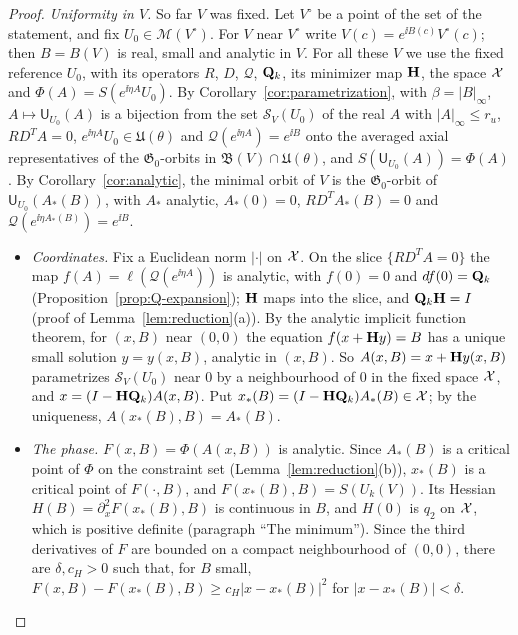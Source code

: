 \begin{proof}
\emph{Uniformity in $V$.} So far $V$ was fixed. Let $V^\circ$ be a point of the set of the statement, and fix $U_0\in\mathscr M(V^\circ)$. For $V$ near $V^\circ$ write $V(c)=e^{\ii B(c)}V^\circ(c)$; then $B=B(V)$ is real, small and analytic in $V$. For all these $V$ we use the fixed reference $U_0$, with its operators $R$, $D$, $\mathcal Q$, $\mathbf Q_k$, its minimizer map $\mathbf H$, the space $\mathcal X$ and $\Phi(A)=S(e^{\ii\eta A}U_0)$. By Corollary~\ref{cor:parametrization}, with $\beta=|B|_\infty$, $A\mapsto\mathsf U_{U_0}(A)$ is a bijection from the set $\mathcal S_V(U_0)$ of the real $A$ with $|A|_\infty\le r_u$, $RD^TA=0$, $e^{\ii\eta A}U_0\in\mathfrak U(\theta)$ and $\mathcal Q(e^{\ii\eta A})=e^{\ii B}$ onto the averaged axial representatives of the $\mathfrak G_0$-orbits in $\mathfrak B(V)\cap\mathfrak U(\theta)$, and $S(\mathsf U_{U_0}(A))=\Phi(A)$. By Corollary~\ref{cor:analytic}, the minimal orbit of $V$ is the $\mathfrak G_0$-orbit of $\mathsf U_{U_0}(A_*(B))$, with $A_*$ analytic, $A_*(0)=0$, $RD^TA_*(B)=0$ and $\mathcal Q(e^{\ii\eta A_*(B)})=e^{\ii B}$.
\begin{itemize}
\item[(i)] \emph{Coordinates.} Fix a Euclidean norm $|\cdot|$ on $\mathcal X$. On the slice $\{RD^TA=0\}$ the map $f(A)=\ell(\mathcal Q(e^{\ii\eta A}))$ is analytic, with $f(0)=0$ and $df(0)=\mathbf Q_k$ (Proposition~\ref{prop:Q-expansion}); $\mathbf H$ maps into the slice, and $\mathbf Q_k\mathbf H=I$ (proof of Lemma~\ref{lem:reduction}(a)). By the analytic implicit function theorem, for $(x,B)$ near $(0,0)$ the equation $f(x+\mathbf H y)=B$ has a unique small solution $y=y(x,B)$, analytic in $(x,B)$. So $A(x,B)=x+\mathbf H y(x,B)$ parametrizes $\mathcal S_V(U_0)$ near $0$ by a neighbourhood of $0$ in the fixed space $\mathcal X$, and $x=(I-\mathbf H\mathbf Q_k)A(x,B)$. Put $x_*(B)=(I-\mathbf H\mathbf Q_k)A_*(B)\in\mathcal X$; by the uniqueness, $A(x_*(B),B)=A_*(B)$.
\item[(ii)] \emph{The phase.} $F(x,B)=\Phi(A(x,B))$ is analytic. Since $A_*(B)$ is a critical point of $\Phi$ on the constraint set (Lemma~\ref{lem:reduction}(b)), $x_*(B)$ is a critical point of $F(\cdot,B)$, and $F(x_*(B),B)=S(U_k(V))$. Its Hessian $H(B)=\partial_x^2F(x_*(B),B)$ is continuous in $B$, and $H(0)$ is $q_2$ on $\mathcal X$, which is positive definite (paragraph ``The minimum''). Since the third derivatives of $F$ are bounded on a compact neighbourhood of $(0,0)$, there are $\delta,c_H>0$ such that, for $B$ small, $F(x,B)-F(x_*(B),B)\ge c_H|x-x_*(B)|^2$ for $|x-x_*(B)|<\delta$.

\end{itemize}
\end{proof}

